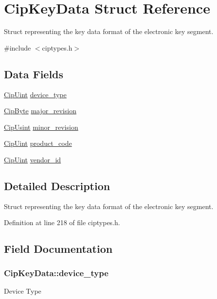 \hypertarget{structCipKeyData}{\section{\-Cip\-Key\-Data \-Struct \-Reference}
\label{df/d55/structCipKeyData}
}


\-Struct representing the key data format of the electronic key segment.  




{\ttfamily \#include $<$ciptypes.\-h$>$}

\subsection*{\-Data \-Fields}
\begin{DoxyCompactItemize}
\item 
\hyperlink{typedefs_8h_a72c0fba927c5681c44dbf59147578fc7}{\-Cip\-Uint} \hyperlink{structCipKeyData_a593b15c9ce4bb6b4441ee0635c1f9796}{device\-\_\-type}
\item 
\hyperlink{typedefs_8h_aa8f68ab5a4077bda5c7bccf53ffe6f8a}{\-Cip\-Byte} \hyperlink{structCipKeyData_a5a27977908b8620e0415af0df2b04b0f}{major\-\_\-revision}
\item 
\hyperlink{typedefs_8h_a378b726bef4c65cb2ec1c1cdf1205f52}{\-Cip\-Usint} \hyperlink{structCipKeyData_a68f494d5f2eb613aa99c1bbd6fd1900b}{minor\-\_\-revision}
\item 
\hyperlink{typedefs_8h_a72c0fba927c5681c44dbf59147578fc7}{\-Cip\-Uint} \hyperlink{structCipKeyData_a0a5beaf0d16ae75c719db6ada40c721b}{product\-\_\-code}
\item 
\hyperlink{typedefs_8h_a72c0fba927c5681c44dbf59147578fc7}{\-Cip\-Uint} \hyperlink{structCipKeyData_aa97bd52f097964a77cb343e068b21d57}{vendor\-\_\-id}
\end{DoxyCompactItemize}


\subsection{\-Detailed \-Description}
\-Struct representing the key data format of the electronic key segment. 



\-Definition at line 218 of file ciptypes.\-h.



\subsection{\-Field \-Documentation}
\hypertarget{structCipKeyData_a593b15c9ce4bb6b4441ee0635c1f9796}{
\subsubsection[{device\-\_\-type}]{ {\bf \-Cip\-Key\-Data\-::device\-\_\-type}}}\label{df/d55/structCipKeyData_a593b15c9ce4bb6b4441ee0635c1f9796}
\-Device \-Type 

